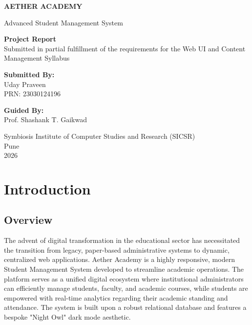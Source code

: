 \documentclass[12pt, a4paper]{report}
\begin{document}
\begin{titlepage}
    \begin{center}
        \vspace*{2cm}
        
        \Huge
        \textbf{AETHER ACADEMY}
        
        \vspace{0.5cm}
        \LARGE
        Advanced Student Management System
        
        \vspace{1.5cm}
        
        \textbf{Project Report} \\
        \large Submitted in partial fulfillment of the requirements for the Web UI and Content Management Syllabus
        
        \vspace{2cm}
        
        \textbf{Submitted By:}\\
        \large
        Uday Praveen \\
        PRN: 23030124196
        
        \vspace{2cm}
        
        \textbf{Guided By:}\\
        \large
        Prof. Shashank T. Gaikwad
        
        \vfill
        
        \Large
        Symbiosis Institute of Computer Studies and Research (SICSR)\\
        Pune\\
        \vspace{0.5cm}
        2026
        
    \end{center}
\end{titlepage}

\tableofcontents
\newpage

\chapter{Introduction}

\section{Overview}
The advent of digital transformation in the educational sector has necessitated the transition from legacy, paper-based administrative systems to dynamic, centralized web applications. Aether Academy is a highly responsive, modern Student Management System developed to streamline academic operations. The platform serves as a unified digital ecosystem where institutional administrators can efficiently manage students, faculty, and academic courses, while students are empowered with real-time analytics regarding their academic standing and attendance. The system is built upon a robust relational database and features a bespoke "Night Owl" dark mode aesthetic.
\end{document}
